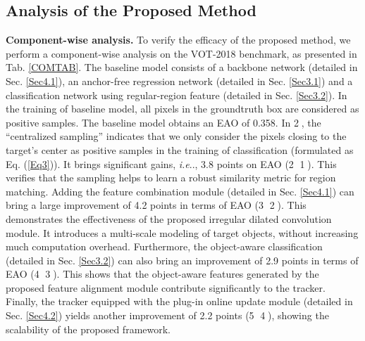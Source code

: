 \documentclass[runningheads]{llncs}
\makeatletter
\DeclareRobustCommand\onedot{\futurelet\@let@token\@onedot}
\def\@onedot{\ifx\@let@token.\else.\null\fi\xspace}
\def\ie{\emph{i.e}\onedot} \def\Ie{\emph{I.e}\onedot}
\makeatother
\begin{document}
\vspace{-0.8em}
\subsection{Analysis of the Proposed Method} \label{Sec5.3}




\noindent\textbf{Component-wise analysis.} To verify the efficacy of the proposed method, we perform a component-wise analysis on the VOT-2018 benchmark, as presented in Tab. \ref{COMTAB}. The baseline model consists of a backbone network (detailed in Sec. \ref{Sec4.1}), an anchor-free regression network (detailed in Sec. \ref{Sec3.1}) and a classification network using regular-region feature (detailed in Sec. \ref{Sec3.2}). In the training of baseline model, all pixels in the groundtruth box are considered as positive samples. The baseline model obtains an EAO of 0.358. In \textcircled{2}, the ``centralized sampling'' indicates that we only consider the pixels closing to the target's center as positive samples in the training of classification (formulated as Eq. (\ref{Eq3})). It brings significant gains, \ie, 3.8 points on EAO (\textcircled{2} \vs \textcircled{1}). This verifies that the sampling helps to learn a robust similarity metric for region matching. Adding the feature combination module (detailed in Sec. \ref{Sec4.1}) can bring a large improvement of 4.2 points in terms of EAO (\textcircled{3} \vs \textcircled{2}). This demonstrates the effectiveness of the proposed irregular dilated convolution module. It introduces a multi-scale modeling of target objects, without increasing much computation overhead. Furthermore, the object-aware classification (detailed in Sec. \ref{Sec3.2}) can also bring an improvement of 2.9 points in terms of EAO (\textcircled{4} \vs \textcircled{3}). This shows that the object-aware features generated by the proposed feature alignment module contribute significantly to the tracker. Finally, the tracker equipped with the plug-in online update module  (detailed in Sec. \ref{Sec4.2}) yields another improvement of 2.2 points (\textcircled{5} \vs \textcircled{4}), showing the scalability of the proposed framework.
\end{document}
